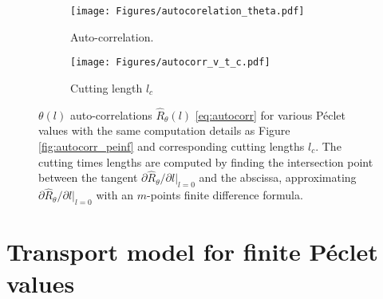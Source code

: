 \begin{figure}[h!]
	\centering
	\begin{subfigure}[b]{0.49\textwidth}
		\centering
		\texttt{[image: Figures/autocorelation\_theta.pdf]}
		\caption{Auto-correlation.}
		\label{fig:autocorrt}
	\end{subfigure}
	\hfill
	\begin{subfigure}[b]{0.49\textwidth}
		\centering
	\texttt{[image: Figures/autocorr\_v\_t\_c.pdf]}
	\caption{Cutting length $l_c$}
	\label{fig:autocorr_l_c}
	\end{subfigure}
	\caption{$\theta(l)$ auto-correlations $\hat{R}_\theta(l)$ \eqref{eq:autocorr} for various Péclet values with the same computation details as Figure \ref{fig:autocorr_peinf} and corresponding cutting lengths $l_c$. The cutting times lengths are computed by finding the intersection point between the tangent $\partial\hat{R}_\theta/\partial l|_{l=0}$ and the abscissa, approximating $\partial\hat{R}_\theta/\partial l|_{l=0}$ with an $m$-points finite difference formula.}
	\label{fig:autocorr}
\end{figure}

\section{Transport model for finite Péclet values}

